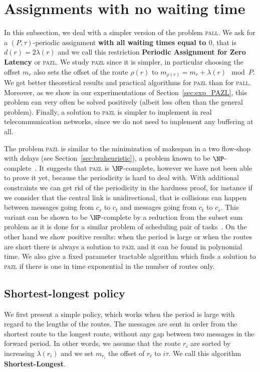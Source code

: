 \documentclass[10pt, conference, letterpaper]{IEEEtran}
\newcommand\pazl{\textsc{pazl}\xspace}
\newcommand\pall{\textsc{pall}\xspace}
\begin{document}
\section{Assignments with no waiting time} \label{sec:PAZL}
  
  In this subsection, we deal with a simpler version of the problem \pall.
  We ask for a $(P,\tau)$-periodic assignment {\bf with all waiting times equal to $0$}, that is $d(r) = 2\lambda(r)$ and we call this restriction {\bf Periodic Assignment for Zero Latency} or \pazl. We study \pazl since it is simpler, in particular 
  choosing the offset $m_r$ also sets the offset of the route $\rho(r)$ to $m_{\rho(r)} = m_{r} + \lambda(r) \mod P$.
  We get better theoretical results and practical algorithms for \pazl than for \pall. Moreover, as we show in our experimentations of Section~\ref{sec:exp_PAZL}, this problem can very often be solved positively (albeit less often than the general problem). Finally, a solution to \pazl is simpler to implement in real telecommunication networks, since we do not need to implement any buffering at all.    
  
   The problem \pazl is similar to the minimization of makespan in a two flow-shop with delays (see Section~\ref{sec:braheuristic}), a problem known to be $\NP$-complete~\cite{yu2004minimizing}. It suggests that \pazl is $\NP$-complete, however we have not been able to prove it yet,  because the periodicity is hard to deal with. With additional constraints we can get rid of the periodicity in the hardness proof, for instance if we consider that the central link is unidirectional, that is collisions can happen between messages going from $c_s$ to $c_t$ and messages  going from $c_t$ to $c_s$. This variant can be shown to be $\NP$-complete by a reduction from the subset sum problem as it is done for a similar problem of scheduling pair of tasks~\cite{orman1997complexity}.
  On the other hand we show positive results:  when the period is large or when the routes are short there is always a solution to \pazl and it can be found in polynomial time. We also give a fixed parameter tractable algorithm which finds a solution to \pazl if there is one in time exponential in the number of routes only. 
  
\subsection{Shortest-longest policy}
    

    We first present a simple policy, which works when the period is large with regard to the lengths of the routes.
    The messages are sent in order from the shortest route to the longest route, without any gap between two messages in the forward period.
    In other words, we assume that the route $r_i$ are sorted by increasing $\lambda(r_i)$ and we set $m_{r_i}$ the offset of $r_i$ to $i\tau$. We call this algorithm {\bf Shortest-Longest}.
      
\end{document}
